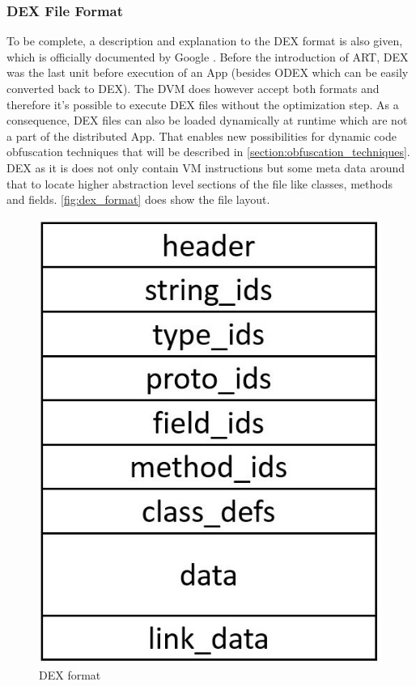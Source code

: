 \subsubsection{DEX File Format}
\label{section:dex_file_format}
To be complete, a description and explanation to the DEX format is also given,
which is officially documented by Google \parencite{dex}.
Before the introduction of ART, DEX was the last unit before
execution of an App (besides ODEX which can be easily converted back to DEX). The DVM does however accept both formats and therefore it's possible to execute
DEX files without the optimization step. As a consequence,
DEX files can also be loaded dynamically at runtime which are not a part
of the distributed App. That enables new possibilities for dynamic code obfuscation techniques that will be described in \autoref{section:obfuscation_techniques}.
DEX as it is does not only contain
VM instructions but some meta data around that to locate
higher abstraction level sections of the file like classes,
methods and fields.
\autoref{fig:dex_format} does show the file layout.
\begin{figure}[htb]
  \centering
  \includegraphics[scale=0.3]{figures/dex_format}
  \caption[DEX format]{DEX format}
  \label{fig:dex_format}
\end{figure}
